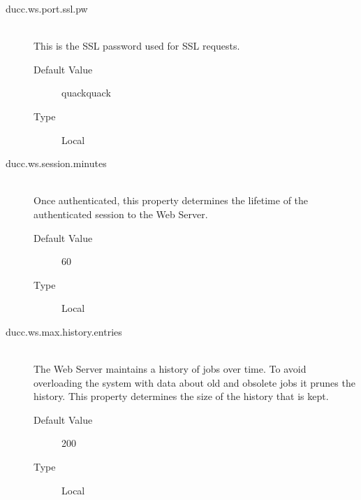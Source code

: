 \begin{description}
        \item[ducc.ws.port.ssl.pw] \hfill \\
          This is the SSL password used for SSL requests. 
          \begin{description}
            \item[Default Value] quackquack 
            \item[Type] Local
          \end{description}
                    
        \item[ducc.ws.session.minutes] \hfill \\
          Once authenticated, this property determines the lifetime of the authenticated session to the 
          Web Server. 
          \begin{description}
            \item[Default Value] 60 
            \item[Type] Local 
          \end{description}

        \item[ducc.ws.max.history.entries] \hfill \\
          The Web Server maintains a history of jobs over time. To avoid overloading the system 
          with data about old and obsolete jobs it prunes the history. This property determines the 
          size of the history that is kept. 
          \begin{description}
            \item[Default Value] 200 
            \item[Type] Local 
          \end{description}
      \end{description}  
            
    
